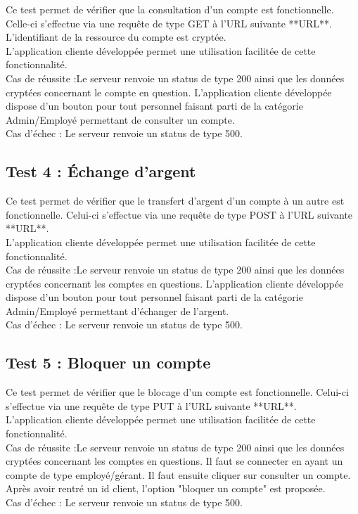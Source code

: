 Ce test permet de vérifier que la consultation d'un compte est fonctionnelle.
Celle-ci s'effectue via une requête de type GET à l’URL suivante **URL**.
L'identifiant de la ressource du compte est cryptée.
\\
L'application cliente développée permet une utilisation facilitée de cette fonctionnalité. 
\\
Cas de réussite :Le serveur renvoie un status de type 200 ainsi que les données cryptées concernant le compte en question.
L'application cliente développée dispose d'un bouton pour tout personnel faisant parti de la catégorie Admin/Employé permettant de consulter un compte.
\\
Cas d'échec : Le serveur renvoie un status de type 500.

\subsection{Test 4 : Échange d'argent}

Ce test permet de vérifier que le transfert d'argent d'un compte à un autre est fonctionnelle.
Celui-ci s'effectue via une requête de type POST à l’URL suivante **URL**.
\\
L'application cliente développée permet une utilisation facilitée de cette fonctionnalité. 
\\
Cas de réussite :Le serveur renvoie un status de type 200 ainsi que les données cryptées concernant les comptes en questions.
L'application cliente développée dispose d'un bouton pour tout personnel faisant parti de la catégorie Admin/Employé permettant d'échanger de l'argent.
\\
Cas d'échec : Le serveur renvoie un status de type 500.

\subsection{Test 5 : Bloquer un compte}

Ce test permet de vérifier que le blocage d'un compte est fonctionnelle.
Celui-ci s'effectue via une requête de type PUT à l’URL suivante **URL**.
\\
L'application cliente développée permet une utilisation facilitée de cette fonctionnalité. 
\\
Cas de réussite :Le serveur renvoie un status de type 200 ainsi que les données cryptées concernant les comptes en questions.
Il faut se connecter en ayant un compte de type employé/gérant. Il faut ensuite cliquer sur consulter un compte. Après avoir rentré un id client, l'option "bloquer un compte" est proposée.
\\
Cas d'échec :  Le serveur renvoie un status de type 500.

